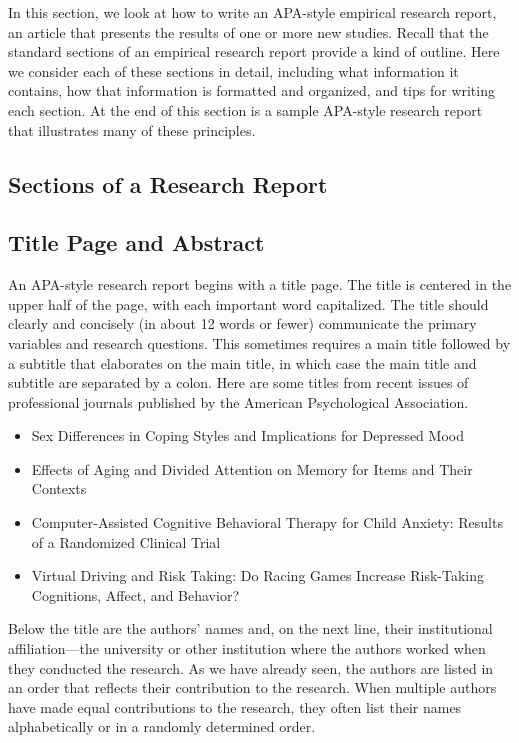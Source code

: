 In this section, we look at how to write an APA-style empirical research report, an article that presents the results of one or more new studies. Recall that the standard sections of an empirical research report provide a kind of outline. Here we consider each of these sections in detail, including what information it contains, how that information is formatted and organized, and tips for writing each section. At the end of this section is a sample APA-style research report that illustrates many of these principles.


\subsection{Sections of a Research Report}

\subsection{Title Page and Abstract}

An APA-style research report begins with a title page. The title is centered in the upper half of the page, with each important word capitalized. The title should clearly and concisely (in about 12 words or fewer) communicate the primary variables and research questions. This sometimes requires a main title followed by a subtitle that elaborates on the main title, in which case the main title and subtitle are separated by a colon. Here are some titles from recent issues of professional journals published by the American Psychological Association.


\begin{itemize}
\item Sex Differences in Coping Styles and Implications for Depressed Mood

\item Effects of Aging and Divided Attention on Memory for Items and Their Contexts

\item Computer-Assisted Cognitive Behavioral Therapy for Child Anxiety: Results of a Randomized Clinical
Trial

\item Virtual Driving and Risk Taking: Do Racing Games Increase Risk-Taking Cognitions, Affect, and
Behavior?

\end{itemize}

Below the title are the authors' names and, on the next line, their institutional affiliation---the university or other institution where the authors worked when they conducted the research. As we have already seen, the authors are listed in an order that reflects their contribution to the research. When multiple authors have made equal contributions to the research, they often list their names alphabetically or in a randomly determined order.
  

